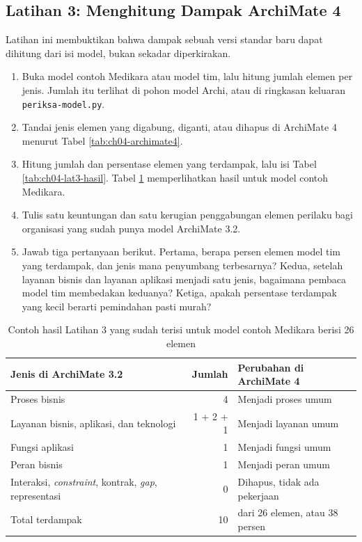 \subsection*{Latihan 3: Menghitung Dampak ArchiMate 4}

Latihan ini membuktikan bahwa dampak sebuah versi standar baru dapat dihitung
dari isi model, bukan sekadar diperkirakan.

\begin{enumerate}
  \item Buka model contoh Medikara atau model tim, lalu hitung jumlah elemen
        per jenis. Jumlah itu terlihat di pohon model Archi, atau di
        ringkasan keluaran \texttt{periksa-model.py}.
  \item Tandai jenis elemen yang digabung, diganti, atau dihapus di ArchiMate
        4 menurut Tabel \ref{tab:ch04-archimate4}.
  \item Hitung jumlah dan persentase elemen yang terdampak, lalu isi Tabel
        \ref{tab:ch04-lat3-hasil}. Tabel \ref{tab:ch04-lat3-contoh}
        memperlihatkan hasil untuk model contoh Medikara.
  \item Tulis satu keuntungan dan satu kerugian penggabungan elemen perilaku
        bagi organisasi yang sudah punya model ArchiMate 3.2.
  \item Jawab tiga pertanyaan berikut. Pertama, berapa persen elemen model
        tim yang terdampak, dan jenis mana penyumbang terbesarnya? Kedua,
        setelah layanan bisnis dan layanan aplikasi menjadi satu jenis,
        bagaimana pembaca model tim membedakan keduanya? Ketiga, apakah
        persentase terdampak yang kecil berarti pemindahan pasti murah?
\end{enumerate}

\begin{table}[!htb]
  \centering
  \caption{Contoh hasil Latihan 3 yang sudah terisi untuk model contoh
           Medikara berisi 26 elemen}
  \label{tab:ch04-lat3-contoh}
  \small
  \begin{tabularx}{\textwidth}{>{\raggedright\arraybackslash}p{3.6cm}r>{\raggedright\arraybackslash}X}
    \hline
    \textbf{Jenis di ArchiMate 3.2} & \textbf{Jumlah} & \textbf{Perubahan di ArchiMate 4} \\
    \hline
    Proses bisnis & 4 & Menjadi proses umum \\
    \hline
    Layanan bisnis, aplikasi, dan teknologi & 1 + 2 + 1 & Menjadi layanan umum \\
    \hline
    Fungsi aplikasi & 1 & Menjadi fungsi umum \\
    \hline
    Peran bisnis & 1 & Menjadi peran umum \\
    \hline
    Interaksi, \textit{constraint}, kontrak, \textit{gap}, representasi & 0 & Dihapus, tidak ada pekerjaan \\
    \hline
    Total terdampak & 10 & 10 dari 26 elemen, atau 38 persen \\
    \hline
  \end{tabularx}
\end{table}

